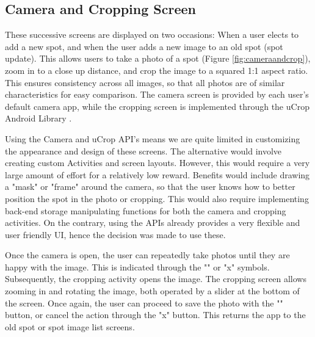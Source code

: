 \subsection{Camera and Cropping Screen}
These successive screens are displayed on two occasions: When a user elects to add a new spot, and when the user adds a new image to an old spot (spot update). This allows users to take a photo of a spot (Figure \ref{fig:cameraandcrop}), zoom in to a close up distance, and crop the image to a squared 1:1 aspect ratio. This ensures consistency across all images, so that all photos are of similar characteristics for easy comparison. The camera screen is provided by each user's default camera app, while the cropping screen is implemented through the uCrop Android Library \cite{yalantis_2019}. 

Using the Camera and uCrop API's means we are quite limited in customizing the appearance and design of these screens. The alternative would involve creating custom Activities and screen layouts. However, this would require a very large amount of effort for a relatively low reward. Benefits would include drawing a "mask" or "frame" around the camera, so that the user knows how to better position the spot in the photo or cropping. This would also require implementing back-end storage manipulating functions for both the camera and cropping activities. On the contrary, using the APIs already provides a very flexible and user friendly UI, hence the decision was made to use these. 

Once the camera is open, the user can repeatedly take photos until they are happy with the image. This is indicated through the "\checkmark" or "x" symbols. Subsequently, the cropping activity opens the image. The cropping screen allows zooming in and rotating the image, both operated by a slider at the bottom of the screen. Once again, the user can proceed to save the photo with the "\checkmark" button, or cancel the action through the "x" button. This returns the app to the old spot or spot image list screens.

